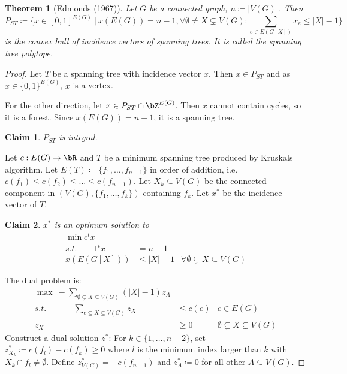 \documentclass[11pt, a4paper]{article}
\newcommand{\abs}[1]{\left\lvert#1\right\rvert}
\newcommand{\set}[1]{\{#1\}}
\newtheorem{theorem}{Theorem}[section]
\newtheorem*{claim}{Claim}
\theoremstyle{remark}
\theoremstyle{definition}
\begin{document}
\begin{theorem}[Edmonds (1967)]
	Let $G$ be a connected graph, $n\coloneqq \abs{V(G)}$. Then
	\[P_{ST}\coloneqq \set{x\in [0,1]^{E(G)}\ |\ x(E(G))=n-1,\forall \emptyset\neq X\subsetneq V(G): \sum_{e\in E(G[X])}x_e\leq \abs{X}-1}\]
	is the convex hull of incidence vectors of spanning trees. It is
	called the spanning tree polytope.
\end{theorem}
\begin{proof}
	Let $T$ be a spanning tree with incidence vector $x$. Then $x\in P_{ST}$
	and as $x\in \set{0,1}^{E(G)}$, $x$ is a vertex.

	For the other direction, let $x\in P_{ST}\cap\bZ^{E(G)}$. Then $x$
	cannot contain cycles, so it is a forest. Since $x(E(G))=n-1$, it is
	a spanning tree.
	\begin{claim}
		$P_{ST}$ is integral.
	\end{claim}
	Let $c: E(G)\to\bR$ and $T$ be a minimum spanning tree produced by Kruskals
	algorithm. Let $E(T)\coloneqq \set{f_1,\ldots,f_{n-1}}$ in order of addition,
	i.e. $c(f_1)\leq c(f_2)\leq\ldots\leq c(f_{n-1})$. Let $X_k\subseteq V(G)$
	be the connected component in $(V(G),\set{f_1,\ldots,f_k})$ containing $f_k$.
	Let $x^*$ be the incidence vector of $T$.
	\begin{claim}
		$x^*$ is an optimum solution to
		\begin{align*}
			\min c^tx                                                                      \\
			s.t.\qquad 1^tx & =n-1                                                         \\
			x(E(G[X]))      & \leq \abs{X}-1 & \forall \emptyset\subsetneq X\subseteq V(G)
		\end{align*}
	\end{claim}
	The dual problem is:
	\begin{align*}
		\max\ -\sum_{\emptyset\subsetneq X\subseteq V(G)}(\abs{X}-1)z_A                                     \\
		s.t.\qquad -\sum_{e\subseteq X\subseteq V(G)}z_X & \leq c(e) & e\in E(G)                            \\
		z_X                                              & \geq 0    & \emptyset\subsetneq X\subsetneq V(G)
	\end{align*}
	Construct a dual solution $z^*$: For $k\in\set{1,\ldots,n-2}$, set
	$z^*_{X_k}\coloneqq c(f_l)-c(f_k)\geq0$ where $l$ is the minimum index larger
	than $k$ with $X_k\cap f_l\neq\emptyset$. Define $z^*_{V(G)}=-c(f_{n-1})$
	and $z^*_A\coloneqq 0$ for all other $A\subseteq V(G)$.


\end{proof}
\end{document}
